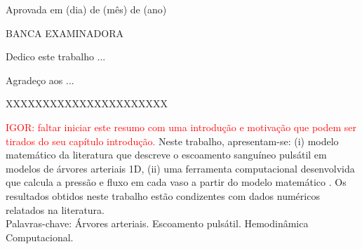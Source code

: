 \documentclass[
        english,			
        brazil			        %
        ,<...>]{abntbibufjf}
\begin{document}

\inserecapa

\inserefolhaderosto

\inserecatalog  


\begin{folhadeaprovacao}
\inicfolhaaprov
        
Aprovada em (dia) de (m\^es) de (ano) %
   
\vfill
\begin{center} BANCA EXAMINADORA \end{center}
\end{folhadeaprovacao}
\cleardoublepage 


 \begin{dedicatoria} 
  Dedico este trabalho ... 
 \end{dedicatoria}

 
\begin{agradecimentos}
Agrade\c{c}o aos ... 
\end{agradecimentos}


\begin{epigrafe} 
XXXXXXXXXXXXXXXXXXXXXX
\end{epigrafe}



\begin{resumo}
\textcolor{red}{IGOR: faltar iniciar este resumo com uma introdução e motivação que podem ser tirados do seu capítulo introdução.}
Neste trabalho, apresentam-se: (i) modelo matemático da literatura que descreve o escoamento sanguíneo pulsátil em modelos de árvores arteriais 1D, (ii) uma ferramenta computacional desenvolvida que calcula a pressão e fluxo em cada vaso a partir do modelo matemático . Os resultados obtidos neste trabalho estão condizentes com dados numéricos relatados na literatura. \\[18pt]
Palavras-chave: Árvores arteriais. Escoamento pulsátil. Hemodinâmica Computacional. %
\end{resumo}
 
\end{document}

